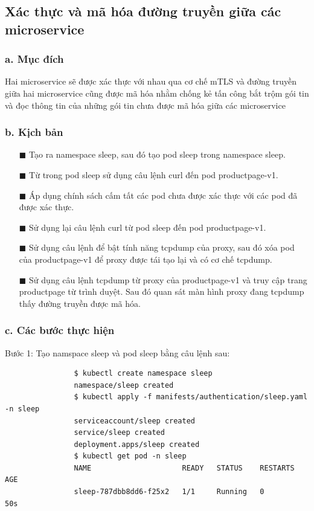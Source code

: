 \documentclass[12pt,a4paper]{report}
\begin{document}
{{		\subsection{Xác thực và mã hóa đường truyền giữa các microservice}
			\subsubsection{a. Mục đích}
				{\hspace{0.6cm}Hai microservice sẽ được xác thực với nhau qua cơ chế mTLS và đường truyền giữa hai microservice cũng được mã hóa nhằm chống kẻ tấn công bắt trộm gói tin và đọc thông tin của những gói tin chưa được mã hóa giữa các microservice}
			\subsubsection{b. Kịch bản}
				\begin{enumerate}
					\item[$\blacksquare$] Tạo ra namespace sleep, sau đó tạo pod sleep trong namespace sleep.
					\item[$\blacksquare$] Từ trong pod sleep sử dụng câu lệnh curl đến pod productpage-v1.
					\item[$\blacksquare$] Áp dụng chính sách cấm tất các pod chưa được xác thực với các pod đã được xác thực.
					\item[$\blacksquare$] Sử dụng lại câu lệnh curl từ pod sleep đến pod productpage-v1.
					\item[$\blacksquare$] Sử dụng câu lệnh để bật tính năng tcpdump của proxy, sau đó xóa pod của productpage-v1 để proxy được tái tạo lại và có cơ chế tcpdump.
					\item[$\blacksquare$] Sử dụng câu lệnh tcpdump từ proxy của productpage-v1 và truy cập trang productpage từ trình duyệt. Sau đó quan sát màn hình proxy đang tcpdump thấy đường truyền được mã hóa. 
				\end{enumerate}
			\subsubsection{c. Các bước thực hiện}
				{\hspace{0.6cm}Bước 1: Tạo namspace sleep và pod sleep bằng câu lệnh sau:}
				\begin{lstlisting}
				$ kubectl create namespace sleep
				namespace/sleep created
				$ kubectl apply -f manifests/authentication/sleep.yaml -n sleep
				serviceaccount/sleep created
				service/sleep created
				deployment.apps/sleep created
				$ kubectl get pod -n sleep
				NAME                     READY   STATUS    RESTARTS   AGE
				sleep-787dbb8dd6-f25x2   1/1     Running   0          50s
				\end{lstlisting}
				
}}
\end{document}
